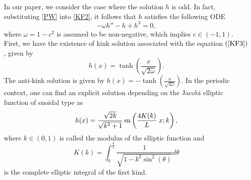 \documentclass[12pt,reqno,a4paper]{amsart} %
\newcommand{\sn}{{\rm \,sn}}
\numberwithin{equation}{section}
\numberwithin{figure}{section}
\begin{document}
 
\indent In our paper, we consider the case where the solution $h$ is odd. In fact, substituting \eqref{PW} into \eqref{KF2}, it follows that $h$ satisfies the following ODE 
\begin{equation}\label{KF3}
-\omega h''-h+h^3=0,
\end{equation}
where $\omega=1-c^2$ is assumed to be non-negative, which implies $c\in(-1,1)$. First, we have the existence of kink solution associated with the equation $(\ref{KF3})$, given by 
\begin{equation}\label{Sol1}
	h(x)= \tanh  \left(\frac{x}{\sqrt{2\omega}}\right).
\end{equation} 
The anti-kink solution is given by $h(x)=-\tanh  \left(\frac{x}{\sqrt{2\omega}}\right)$. In the periodic context, one can find an explicit solution depending on the Jacobi elliptic function of snoidal type as
\begin{equation}\label{Sol2}
h(x)=\frac{\sqrt{2k}}{\sqrt{k^2+1}} \sn \left(\frac{4K(k)}{L}\;x;k \right),
\end{equation} 
where $k\in\left(0,1\right)$ is called the modulus of the elliptic function and $$K(k)=\displaystyle\int_{0}^{\frac{\pi}{2}}\frac{1}{\sqrt{1-k^2\sin^2(\theta)}}d\theta$$ is the complete  elliptic integral of the first kind.
\end{document}
